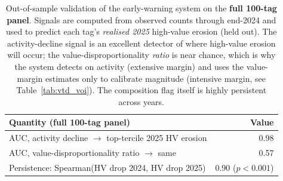 \begin{table}[ht]
\centering
\caption{Out-of-sample validation of the early-warning system on the
\textbf{full 100-tag panel}. Signals are computed from observed counts
through end-2024 and used to predict each tag's \emph{realised 2025}
high-value erosion (held out). The activity-decline signal is an
excellent detector of where high-value erosion will occur; the
value-disproportionality \emph{ratio} is near chance, which is why the
system detects on activity (extensive margin) and uses the value-margin
estimates only to calibrate magnitude (intensive margin, see
Table~\ref{tab:vtd_voi}). The composition flag itself is highly
persistent across years.}
\label{tab:vtd_validation}
\small
\begin{tabular}{lr}
\toprule
Quantity (full 100-tag panel) & Value \\
\midrule
AUC, activity decline $\to$ top-tercile 2025 HV erosion & 0.98 \\
AUC, value-disproportionality ratio $\to$ same & 0.57 \\
\midrule
Persistence: Spearman(HV drop 2024, HV drop 2025) & 0.90 ($p<0.001$) \\
\bottomrule
\end{tabular}
\end{table}
